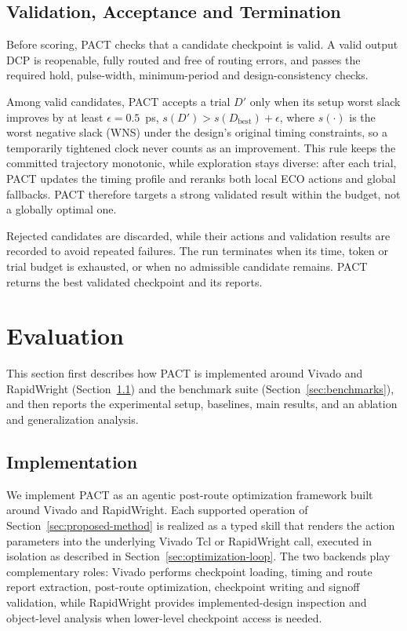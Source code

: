 \documentclass[conference]{IEEEtran}
\begin{document}
\subsection{Validation, Acceptance and Termination}
\label{sec:validation-gates}

Before scoring, PACT checks that a candidate checkpoint is valid. A
valid output DCP is reopenable, fully routed and free of routing errors,
and passes the required hold, pulse-width, minimum-period and
design-consistency checks.

Among valid candidates, PACT accepts a trial $D'$ only when its
setup worst slack improves by at least $\epsilon=0.5$~ps,
$s(D') > s(D_{\mathrm{best}}) + \epsilon$, where $s(\cdot)$ is the worst
negative slack (WNS) under the design's original timing constraints, so a temporarily
tightened clock never counts as an improvement. This rule keeps the
committed trajectory monotonic, while exploration stays diverse: after
each trial, PACT updates the timing profile and reranks both local ECO
actions and global fallbacks. PACT therefore targets a strong validated
result within the budget, not a globally optimal one.

Rejected candidates are discarded, while their actions and
validation results are recorded to avoid repeated failures. The run
terminates when its time, token or trial budget is exhausted, or when
no admissible candidate remains. PACT returns the best validated
checkpoint and its reports.



\section{Evaluation}
\label{sec:evaluation}

This section first describes how PACT is implemented around Vivado
and RapidWright (Section~\ref{sec:implementation}) and the benchmark
suite (Section~\ref{sec:benchmarks}), and then reports the experimental
setup, baselines, main results, and an ablation and generalization
analysis.

\subsection{Implementation}
\label{sec:implementation}

We implement PACT as an agentic post-route optimization framework
built around Vivado and RapidWright. Each supported operation of
Section~\ref{sec:proposed-method} is realized as a typed skill that
renders the action parameters into the underlying Vivado Tcl or
RapidWright call, executed in isolation as described in
Section~\ref{sec:optimization-loop}. The two backends play
complementary roles: Vivado performs checkpoint loading, timing and
route report extraction, post-route optimization, checkpoint writing
and signoff validation, while RapidWright provides implemented-design
inspection and object-level analysis when lower-level checkpoint access
is needed.
\end{document}
